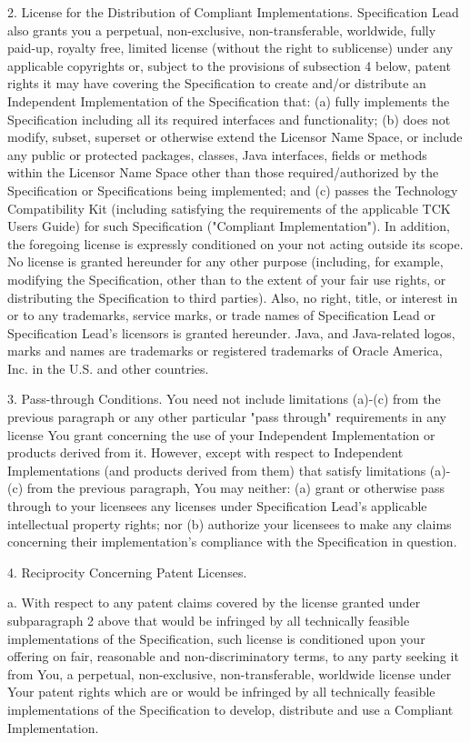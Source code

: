 2. License for the Distribution of Compliant Implementations. Specification Lead  also grants you a perpetual, non-exclusive, non-transferable, worldwide, fully paid-up, royalty free, limited license (without the right to sublicense) under any applicable copyrights or, subject to the provisions of subsection 4 below, patent rights it may have covering the Specification to create and/or distribute an Independent Implementation of the Specification that: (a) fully implements the Specification including all its required interfaces and functionality; (b) does not modify, subset, superset or otherwise extend the Licensor Name Space, or include any public or protected packages, classes, Java interfaces, fields or methods within the Licensor Name Space other than those required/authorized by the Specification or Specifications being implemented; and (c) passes the Technology Compatibility Kit (including satisfying the requirements of the applicable TCK Users Guide) for such Specification ("Compliant Implementation").  In addition, the foregoing license is expressly conditioned on your not acting outside its scope.  No license is granted hereunder for any other purpose (including, for example, modifying the Specification, other than to the extent of your fair use rights, or distributing the Specification to third parties).  Also, no right, title, or interest in or to any trademarks, service marks, or trade names of Specification Lead or Specification Lead's licensors is granted hereunder.  Java, and Java-related logos, marks and names are trademarks or registered trademarks of Oracle America, Inc. in the U.S. and other countries.

3. Pass-through Conditions. You need not include limitations (a)-(c) from the previous paragraph or any other particular "pass through" requirements in any license You grant concerning the use of your Independent Implementation or products derived from it.  However, except with respect to Independent Implementations (and products derived from them) that satisfy limitations (a)-(c) from the previous paragraph, You may neither:  (a) grant or otherwise pass through to your licensees any licenses under Specification Lead's  applicable intellectual property rights; nor (b) authorize your licensees to make any claims concerning their implementation's compliance with the Specification in question.

4. Reciprocity Concerning Patent Licenses.  

	a.  With respect to any patent claims covered by the license granted under subparagraph 2 above that would be infringed by all technically feasible implementations of the Specification, such license is conditioned upon your offering on fair, reasonable and non-discriminatory terms, to any party seeking it from You, a perpetual, non-exclusive, non-transferable, worldwide license under Your patent rights which are or would be infringed by all technically feasible implementations of the Specification to develop, distribute and use a Compliant Implementation.

